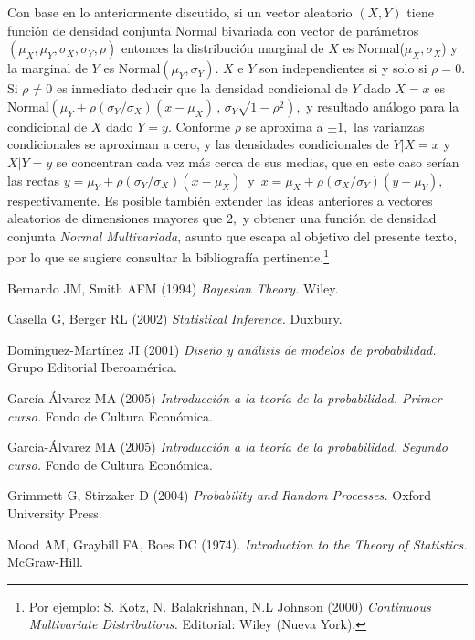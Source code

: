 \documentclass[spanish,10pt,letterpaper]{article}
\begin{document}
Con base en lo anteriormente discutido, si un vector aleatorio $(X,Y)$ tiene función de densidad conjunta Normal bivariada con vector de parámetros $(\mu_X,\mu_Y,\sigma_X,\sigma_Y,\rho)$ entonces la distribución marginal de $X$ es Normal($\mu_X,\sigma_X$) y la marginal de $Y$ es Normal$(\mu_Y,\sigma_Y).$ $X$ e $Y$ son independientes si y solo si $\rho=0.$ Si $\rho\neq 0$ es inmediato deducir que la densidad condicional de $Y$ dado $X=x$ es Normal$(\mu_Y+\rho(\sigma_Y/\sigma_X)(x-\mu_X)\,,\,\sigma_Y\sqrt{1-\rho^2}),$ y resultado análogo para la condicional de $X$ dado $Y=y.$  Conforme $\rho$ se aproxima a $\pm 1,$ las varianzas condicionales se aproximan a cero, y las densidades condicionales de $Y|X=x$ y $X|Y=y$ se concentran cada vez más cerca de sus medias, que en este caso serían las rectas $y=\mu_Y+\rho(\sigma_Y/\sigma_X)(x-\mu_X)\,$ y $\,x=\mu_X+\rho(\sigma_X/\sigma_Y)(y-\mu_Y),$ respectivamente. Es posible también extender las ideas anteriores a vectores aleatorios de dimensiones mayores que $2,$ y obtener una función de densidad conjunta \textit{Normal Multivariada}, asunto que escapa al objetivo del presente texto, por lo que se sugiere consultar la bibliografía pertinente.\footnote{Por ejemplo: S. Kotz, N. Balakrishnan, N.L Johnson (2000) \textit{Continuous Multivariate Distributions.} Editorial: Wiley (Nueva York).}

\newpage
	
\begin{thebibliography}{99}
		
     Bernardo JM, Smith AFM (1994) \textit{Bayesian Theory.} Wiley.
		
     Casella G, Berger RL (2002) \textit{Statistical Inference.} Duxbury.
		
     Domínguez-Martínez JI (2001) \textit{Diseño y análisis de modelos de probabilidad.} Grupo Editorial Iberoamérica.
		
     García-Álvarez MA (2005) \textit{Introducción a la teoría de la probabilidad. Primer curso.} Fondo de Cultura Económica.
		
     García-Álvarez MA (2005) \textit{Introducción a la teoría de la probabilidad. Segundo curso.} Fondo de Cultura Económica.
		
     Grimmett G, Stirzaker D (2004) \textit{Probability and Random Processes.} Oxford University Press.
		
     Mood AM, Graybill FA, Boes DC (1974). \textit{Introduction to the Theory of Statistics.} McGraw-Hill.
		
\end{thebibliography}
	
\end{document}
